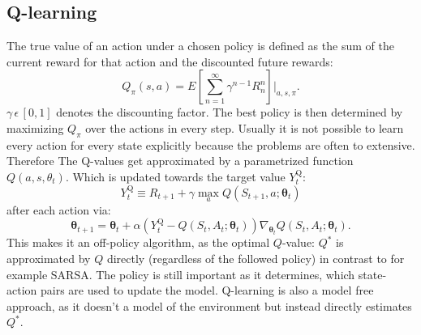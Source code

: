 \documentclass[12pt]{article}
\begin{document}
\subsection{Q-learning}
The true value of an action under a chosen policy is defined as the sum of the current reward for that action and the discounted future rewards:
\begin{equation}
Q_\pi(s,a)= E\left[\sum_{n=1}^{\infty} \gamma^{n-1}R_n^n\right] \Bigg|_{a,s,\pi}.
\end{equation} 
$\gamma\,\epsilon\,[0,1]$ denotes the discounting factor.
The best policy is then determined by maximizing $Q_\pi$ over the actions in every step.
Usually it is not possible to learn every action for every state explicitly because the problems are often to extensive. Therefore The Q-values get approximated by a parametrized function $Q(a,s,\theta_t)$. Which is updated towards the target value $Y_{t}^{\mathrm{Q}}$:
\begin{equation}
Y_{t}^{\mathrm{Q}} \equiv R_{t+1}+\gamma \max _{a} Q\left(S_{t+1}, a ; \boldsymbol{\theta}_{t}\right)
\end{equation}
after each action via:
\begin{equation}
\boldsymbol{\theta}_{t+1}=\boldsymbol{\theta}_{t}+\alpha\left(Y_{t}^{\mathrm{Q}}-Q\left(S_{t}, A_{t} ; \boldsymbol{\theta}_{t}\right)\right) \nabla_{\boldsymbol{\theta}_{t}} Q\left(S_{t}, A_{t} ; \boldsymbol{\theta}_{t}\right).
\end{equation}
\cite{DBLP:journals/corr/HasseltGS15}
This makes it an off-policy algorithm, as the optimal $Q$-value: $Q^*$ is approximated by $Q$ directly (regardless of the followed policy) in contrast to for example SARSA. The policy is still important as it determines, which state-action pairs are used to update the model\cite{Sutton:1998:IRL:551283}. 
Q-learning is also a model free approach, as it doesn't a model of the environment but instead directly estimates $Q^*$.
\end{document}
